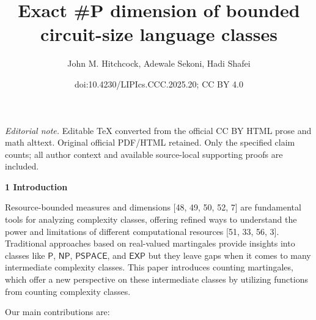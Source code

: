 \documentclass[10pt,a4paper]{article}
\title{Exact \#P dimension of bounded circuit-size language classes}
\author{John M. Hitchcock, Adewale Sekoni, Hadi Shafei}
\date{doi:10.4230/LIPIcs.CCC.2025.20; CC BY 4.0}
\begin{document}
\maketitle
\noindent\textit{Editorial note.} Editable TeX converted from the official CC BY HTML prose and math alttext. Original official PDF/HTML retained. Only the specified claim counts; all author context and available source-local supporting proofs are included.\par\medskip


\par\medskip\noindent\textbf{
1 Introduction}\par




Resource-bounded measures and dimensions [48, 49, 50, 52, 7] are fundamental tools for analyzing complexity classes, offering refined ways to understand the power and limitations of different computational resources [51, 33, 56, 3].
Traditional approaches based on real-valued martingales provide insights into classes like $\mathsf{P}$, $\mathsf{NP}$, $\mathsf{PSPACE}$, and $\mathsf{EXP}$ but they leave gaps when it comes to many intermediate complexity classes. This paper introduces counting martingales, which offer a new perspective on these intermediate classes by utilizing functions from counting complexity classes.\par




Our main contributions are:\par
\end{document}
